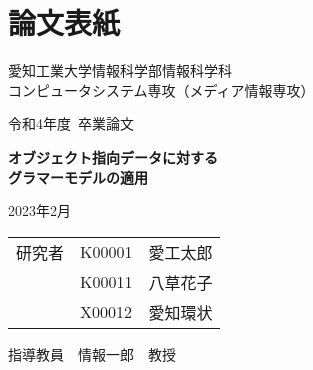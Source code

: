 \chapter{論文表紙}
\thispagestyle{myheadings}

\vspace{-1.0cm}

\begin{center}

{\LARGE 愛知工業大学情報科学部情報科学科\\
コンピュータシステム専攻（メディア情報専攻）

\vspace{1.0cm}

令和4年度~卒業論文\\

\vspace{2.0cm}

{\Huge
\baselineskip=15mm
\textbf{オブジェクト指向データに対する\\
グラマーモデルの適用\\}}

\vspace{7.0cm}

2023年2月\\

\vspace{1.0cm}

\begin{tabular}[h]{lll}
  研究者  & K00001 & 愛工太郎\\
         & K00011 & 八草花子\\
         & X00012 & 愛知環状\\
\end{tabular}

\vspace{1.0cm}

指導教員\ \ 情報一郎\ \ 教授}

\end{center}

